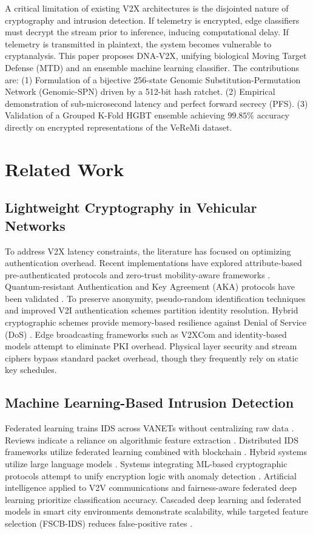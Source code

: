 \documentclass[journal]{IEEEtran}
\begin{document}
A critical limitation of existing V2X architectures is the disjointed nature of cryptography and intrusion detection. If telemetry is encrypted, edge classifiers must decrypt the stream prior to inference, inducing computational delay. If telemetry is transmitted in plaintext, the system becomes vulnerable to cryptanalysis. This paper proposes DNA-V2X, unifying biological Moving Target Defense (MTD) and an ensemble machine learning classifier. The contributions are: (1) Formulation of a bijective 256-state Genomic Substitution-Permutation Network (Genomic-SPN) driven by a 512-bit hash ratchet. (2) Empirical demonstration of sub-microsecond latency and perfect forward secrecy (PFS). (3) Validation of a Grouped K-Fold HGBT ensemble achieving $99.85\%$ accuracy directly on encrypted representations of the VeReMi dataset.

\section{Related Work}
\subsection{Lightweight Cryptography in Vehicular Networks}
To address V2X latency constraints, the literature has focused on optimizing authentication overhead. Recent implementations have explored attribute-based pre-authenticated protocols \cite{ref4} and zero-trust mobility-aware frameworks \cite{ref5}. Quantum-resistant Authentication and Key Agreement (AKA) protocols have been validated \cite{ref6}. To preserve anonymity, pseudo-random identification techniques \cite{ref7} and improved V2I authentication schemes \cite{ref8} partition identity resolution. Hybrid cryptographic schemes provide memory-based resilience against Denial of Service (DoS) \cite{ref9}. Edge broadcasting frameworks such as V2XCom \cite{ref10} and identity-based models \cite{ref11} attempt to eliminate PKI overhead. Physical layer security \cite{ref12} and stream ciphers \cite{ref13} bypass standard packet overhead, though they frequently rely on static key schedules.

\subsection{Machine Learning-Based Intrusion Detection}
Federated learning trains IDS across VANETs without centralizing raw data \cite{ref14}. Reviews indicate a reliance on algorithmic feature extraction \cite{ref15}. Distributed IDS frameworks utilize federated learning combined with blockchain \cite{ref16}. Hybrid systems utilize large language models \cite{ref17}. Systems integrating ML-based cryptographic protocols attempt to unify encryption logic with anomaly detection \cite{ref18}. Artificial intelligence applied to V2V communications \cite{ref19} and fairness-aware federated deep learning \cite{ref20} prioritize classification accuracy. Cascaded deep learning \cite{ref21} and federated models in smart city environments \cite{ref22} demonstrate scalability, while targeted feature selection (FSCB-IDS) reduces false-positive rates \cite{ref23}.
\end{document}
